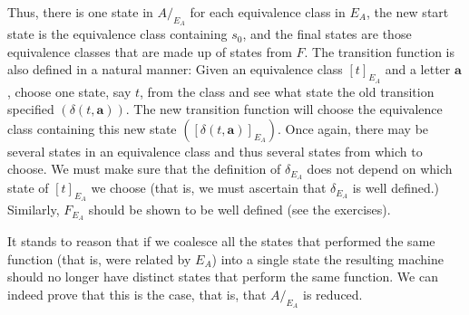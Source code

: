 Thus, there is one state in $A/  _{E_A}$ for each equivalence class in $E_A$, the
new start state is the equivalence class containing $s_0$, and the final states
are those equivalence classes that are made up of states from $F$. The
transition function is also defined in a natural manner: Given an equivalence
class $[t]_{E_A}$ and a letter $\pmb{a}$, choose one state, say $t$, from the class
and see what state the old transition specified $(\delta(t,\pmb{a}))$. The new
transition function will choose the equivalence class containing this new state
$([\delta(t,\pmb{a})]_{E_A})$. Once again, there may be several states in an
equivalence class and thus several states from which to choose. We must make
sure that the definition of $\delta_{E_A}$ does not depend on which state of
$[t]_{E_A}$ we choose (that is, we must ascertain that $\delta_{E_A}$ is well
defined.) Similarly, $F_{E_A}$ should be shown to be well defined (see the
exercises).

It stands to reason that if we coalesce all the states that performed the same
function (that is, were related by $E_A$) into a single state the resulting
machine should no longer have distinct states that perform the same function. We
can indeed prove that this is the case, that is, that $A/_{E_A}$ is reduced.

